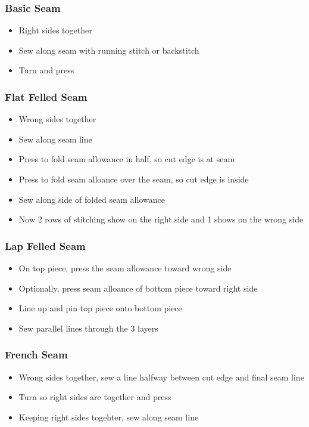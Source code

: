 \documentclass{beamer}
\begin{document}
\begin{frame}[fragile]
\frametitle{Basic Seam}
\begin{itemize}
\item Right sides together
\item Sew along seam with running stitch or backstitch
\item Turn and press
\end{itemize}
\end{frame}

\begin{frame}[fragile]
\frametitle{Flat Felled Seam}
\begin{itemize}
\item Wrong sides together
\item Sew along seam line
\item Press to fold seam allowance in half, so cut edge is at seam
\item Press to fold seam alloance over the seam, so cut edge is inside
\item Sew along side of folded seam allowance
\item Now 2 rows of stitching show on the right side and 1 shows on the wrong side
\end{itemize}
\end{frame}

\begin{frame}[fragile]
\frametitle{Lap Felled Seam}
\begin{itemize}
\item On top piece, press the seam allowance toward wrong side
\item Optionally, press seam alloance of bottom piece toward right side
\item Line up and pin top piece onto bottom piece
\item Sew parallel lines through the 3 layers
\end{itemize}
\end{frame}

\begin{frame}[fragile]
\frametitle{French Seam}
\begin{itemize}
\item Wrong sides together, sew a line halfway between cut edge and final seam line
\item Turn so right sides are together and press
\item Keeping right sides togehter, sew along seam line
\end{itemize}
\end{frame}
\end{document}
